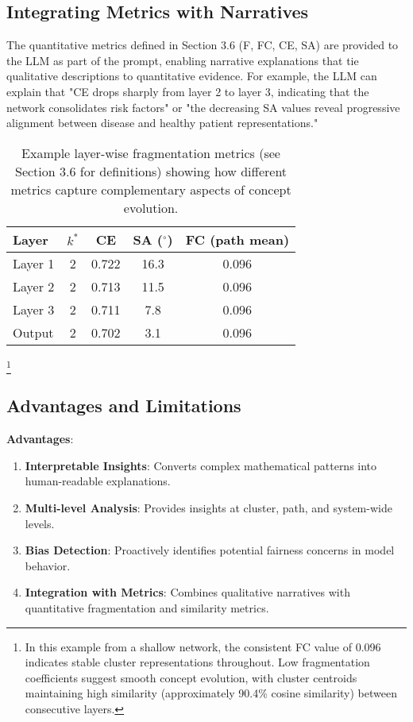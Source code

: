 
\subsection{Integrating Metrics with Narratives}

The quantitative metrics defined in Section 3.6 (F, FC, CE, SA) are provided to the LLM as part of the prompt, enabling narrative explanations that tie qualitative descriptions to quantitative evidence. For example, the LLM can explain that "CE drops sharply from layer 2 to layer 3, indicating that the network consolidates risk factors" or "the decreasing SA values reveal progressive alignment between disease and healthy patient representations."


\begin{table}[h!]
\centering
\caption{Example layer-wise fragmentation metrics (see Section 3.6 for definitions) showing how different metrics capture complementary aspects of concept evolution.}
\label{tab:fragmentation_metrics_example}
\begin{tabular}{lcccc}
\toprule
Layer & $k^*$ & CE & SA ($^\circ$) & FC (path mean) \\
\midrule
Layer 1 & 2 & 0.722 & 16.3 & 0.096 \\
Layer 2 & 2 & 0.713 & 11.5 & 0.096 \\
Layer 3 & 2 & 0.711 &  7.8 & 0.096 \\
Output  & 2 & 0.702 &  3.1 & 0.096 \\
\bottomrule
\end{tabular}
\end{table}\footnote{In this example from a shallow network, the consistent FC value of 0.096 indicates stable cluster representations throughout. Low fragmentation coefficients suggest smooth concept evolution, with cluster centroids maintaining high similarity (approximately 90.4\% cosine similarity) between consecutive layers.}

\subsection{Advantages and Limitations}

\textbf{Advantages}:
\begin{enumerate}
    \item \textbf{Interpretable Insights}: Converts complex mathematical patterns into human-readable explanations.
    \item \textbf{Multi-level Analysis}: Provides insights at cluster, path, and system-wide levels.
    \item \textbf{Bias Detection}: Proactively identifies potential fairness concerns in model behavior.
    \item \textbf{Integration with Metrics}: Combines qualitative narratives with quantitative fragmentation and similarity metrics.
\end{enumerate}

